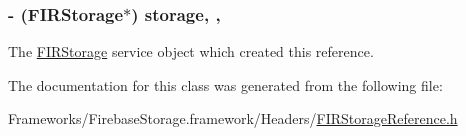 \subsubsection[{storage}]{\setlength{\rightskip}{0pt plus 5cm}-\/ ({\bf F\+I\+R\+Storage}$\ast$) storage\hspace{0.3cm}{\ttfamily [read]}, {\ttfamily [nonatomic]}, {\ttfamily [assign]}}\label{interface_f_i_r_storage_reference_a7441bb92a62af97dfdecbefbe9999180}
The \hyperlink{interface_f_i_r_storage}{F\+I\+R\+Storage} service object which created this reference. 

The documentation for this class was generated from the following file\+:\begin{DoxyCompactItemize}
\item 
Frameworks/\+Firebase\+Storage.\+framework/\+Headers/\hyperlink{_f_i_r_storage_reference_8h}{F\+I\+R\+Storage\+Reference.\+h}\end{DoxyCompactItemize}
